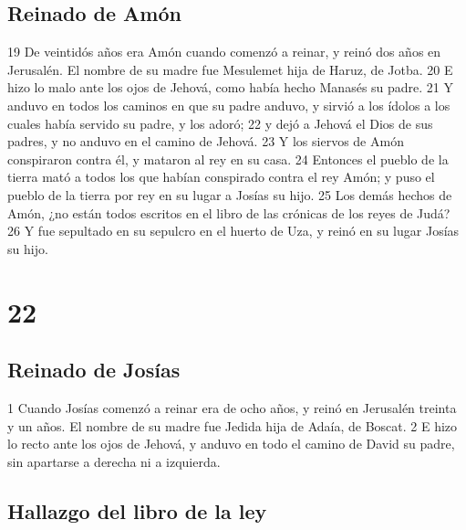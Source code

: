 \section*{Reinado de Amón}

19 De veintidós años era Amón cuando comenzó a reinar, y reinó dos años en Jerusalén. El nombre de su madre fue Mesulemet hija de Haruz, de Jotba.
20 E hizo lo malo ante los ojos de Jehová, como había hecho Manasés su padre.
21 Y anduvo en todos los caminos en que su padre anduvo, y sirvió a los ídolos a los cuales había servido su padre, y los adoró;
22 y dejó a Jehová el Dios de sus padres, y no anduvo en el camino de Jehová.
23 Y los siervos de Amón conspiraron contra él, y mataron al rey en su casa.
24 Entonces el pueblo de la tierra mató a todos los que habían conspirado contra el rey Amón; y puso el pueblo de la tierra por rey en su lugar a Josías su hijo.
25 Los demás hechos de Amón, ¿no están todos escritos en el libro de las crónicas de los reyes de Judá?
26 Y fue sepultado en su sepulcro en el huerto de Uza, y reinó en su lugar Josías su hijo.

\chapter{22}

\section*{Reinado de Josías}

1 Cuando Josías comenzó a reinar era de ocho años, y reinó en Jerusalén treinta y un años. El nombre de su madre fue Jedida hija de Adaía, de Boscat.
2 E hizo lo recto ante los ojos de Jehová, y anduvo en todo el camino de David su padre, sin apartarse a derecha ni a izquierda.

\section*{Hallazgo del libro de la ley}

